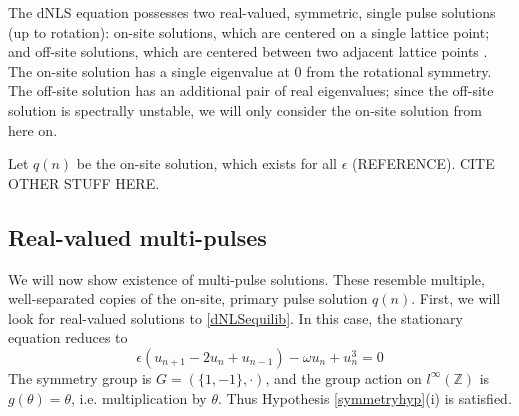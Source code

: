 \documentclass[12pt]{article}
\def\Z{{\mathbb Z}}
\begin{document}
The dNLS equation possesses two real-valued, symmetric, single pulse solutions (up to rotation): on-site solutions, which are centered on a single lattice point; and off-site solutions, which are centered between two adjacent lattice points \cite{Kevrekidis2009}. The on-site solution has a single eigenvalue at 0 from the rotational symmetry. The off-site solution has an additional pair of real eigenvalues; since the off-site solution is spectrally unstable, we will only consider the on-site solution from here on. 

Let $q(n)$ be the on-site solution, which exists for all $\epsilon$ (REFERENCE). CITE OTHER STUFF HERE.

\subsection{Real-valued multi-pulses}

We will now show existence of multi-pulse solutions. These resemble multiple, well-separated copies of the on-site, primary pulse solution $q(n)$. First, we will look for real-valued solutions to \eqref{dNLSequilib}. In this case, the stationary equation reduces to
\begin{equation}\label{dNLSequilibreal}
\epsilon(u_{n+1} - 2 u_n + u_{n-1}) - \omega u_n + u_n^3 = 0
\end{equation}
The symmetry group is $G = (\{1, -1\}, \cdot)$, and the group action on $l^\infty(\Z)$ is $g(\theta) = \theta$, i.e. multiplication by $\theta$. Thus Hypothesis \eqref{symmetryhyp}(i) is satisfied.
\end{document}

